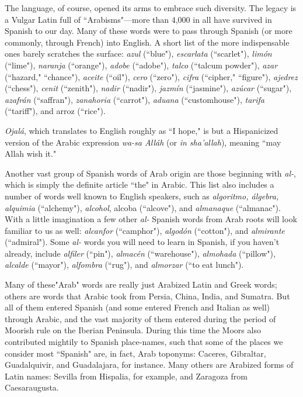 The language, of course, opened its arms to embrace such
diversity. The legacy is a Vulgar Latin full of ``Arabisms"---more
than 4,000 in all have survived in Spanish to our day. Many of these
words were to pass through Spanish (or more commonly, through
French) into English. A short list of the more indispensable ones
barely scratches the surface: \emph{azul} (``blue"), \emph{escarlata} (``scarlet"), \emph{limón} (``lime"), \emph{naranja} (``orange"), \emph{adobe} (``adobe"), \emph{talco} (``talcum
powder"), \emph{azar} (``hazard," ``chance"), \emph{aceite} (``oil"), \emph{cero} (``zero"), \emph{cifra}
(``cipher," ``figure"), \emph{ajedrez} (``chess"), \emph{cenit} (``zenith"), \emph{nadir} (``nadir"),
\emph{jazmín} (``jasmine"), \emph{azúcar} (``sugar"), \emph{azafrán} (``saffran"), \emph{zanahoria}
(``carrot"), \emph{aduana} (``customhouse"), \emph{tarifa} (``tariff"), and arroz (``rice").

\emph{Ojalá}, which translates to English roughly as ``I hope," is but
a Hispanicized version of the Arabic expression \emph{wa-sa Alláh} (or \emph{in
sha'allah}), meaning ``may Allah wish it."

Another vast group of Spanish words of Arab origin are those
beginning with \emph{al-}, which is simply the definite article ``the" in Arabic. This list also includes a number of words well known to English
speakers, such as \emph{algoritmo, álgebra, alquimia} (``alchemy"), \emph{alcohol},
alcoba (``alcove"), and \emph{almanaque} (``almanac"). With a little imagination a few other \emph{al-} Spanish words from Arab roots will look familiar
to us as well: \emph{alcanfor} (``camphor"), \emph{algodón} (``cotton"), and \emph{almirante}
(``admiral"). Some \emph{al-} words you will need to learn in Spanish, if you
haven't already, include \emph{alfiler} (``pin"), \emph{almacén} (``warehouse"), \emph{almohada} (``pillow"), \emph{alcalde} (``mayor"), \emph{alfombra} (``rug"), and \emph{almorzar}
(``to eat lunch").

Many of these"Arab" words are really just Arabized Latin and
Greek words; others are words that Arabic took from Persia, China, India, and Sumatra. But all of them entered Spanish (and some entered
French and Italian as well) through Arabic, and the vast majority of
them entered during the period of Moorish rule on the Iberian Peninsula. During this time the Moors also contributed mightily to Spanish
place-names, such that some of the places we consider most ``Spanish"
are, in fact, Arab toponyms: Caceres, Gibraltar, Guadalquivir, and
Guadalajara, for instance. Many others are Arabized forms of Latin
names: Sevilla from Hispalia, for example, and Zaragoza from Caesaraugusta.

